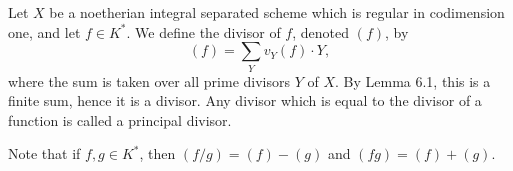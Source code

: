 Let $X$ be a noetherian integral separated scheme which is regular in codimension one, and let $f \in K^*$. We define the divisor of $f$, denoted $(f)$, by
$$(f) = \sum_Y v_Y(f) \cdot Y,$$
where the sum is taken over all prime divisors $Y$ of $X$. By Lemma 6.1, this is a finite sum, hence it is a divisor. Any divisor which is equal to the divisor of a function is called a principal divisor.

Note that if $f, g \in K^*$, then $(f/g) = (f) - (g)$ and $(fg) = (f) + (g)$.

